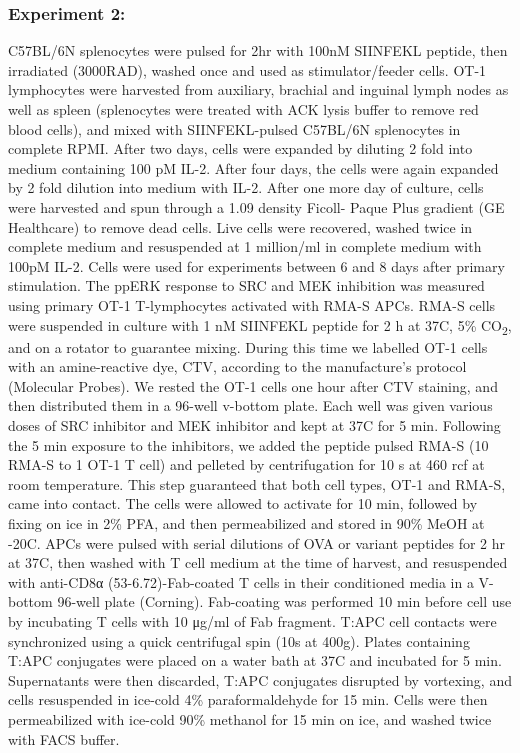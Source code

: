 \documentclass[11pt,a4paper,draft]{article}
\begin{document}
\subsubsection*{Experiment 2:} C57BL/6N splenocytes were pulsed for 2hr with 100nM SIINFEKL peptide, then irradiated (3000RAD), washed once and used as stimulator/feeder cells. OT-1 lymphocytes were harvested from auxiliary, brachial and inguinal lymph nodes as well as spleen (splenocytes were treated with ACK lysis buffer to remove red blood cells), and mixed with SIINFEKL-pulsed C57BL/6N splenocytes in complete RPMI. After two days, cells were expanded by diluting 2 fold into medium containing 100 pM IL-2. After four days, the cells were again expanded by 2 fold dilution into medium with IL-2. After one more day of culture, cells were harvested and spun through a 1.09 density Ficoll- Paque Plus gradient (GE Healthcare) to remove dead cells. Live cells were recovered, washed twice in complete medium and resuspended at 1 million/ml in complete medium with 100pM IL-2. Cells were used for experiments between 6 and 8 days after primary stimulation. The ppERK response to SRC and MEK inhibition was measured using primary OT-1 T-lymphocytes activated with RMA-S APCs. RMA-S cells were suspended in culture with 1 nM SIINFEKL peptide for 2 h at 37C, 5\% CO\textsubscript{2}, and on a rotator to guarantee mixing. During this time we labelled OT-1 cells with an amine-reactive dye, CTV, according to the manufacture’s protocol (Molecular Probes). We rested the OT-1 cells one hour after CTV staining, and then distributed them in a 96-well v-bottom plate. Each well was given various doses of SRC inhibitor and MEK inhibitor and kept at 37C for 5 min. Following the 5 min exposure to the inhibitors, we added the peptide pulsed RMA-S (10 RMA-S to 1 OT-1 T cell) and pelleted by centrifugation for 10 s at 460 rcf at room temperature. This step guaranteed that both cell types, OT-1 and RMA-S, came into contact. The cells were allowed to activate for 10 min, followed by fixing on ice in 2\% PFA, and then permeabilized and stored in 90\% MeOH at  -20C. APCs were pulsed with serial dilutions of OVA or variant peptides for 2 hr at 37C, then washed with T cell medium at the time of harvest, and resuspended with anti-CD8α (53-6.72)-Fab-coated T cells in their conditioned media in a V-bottom 96-well plate (Corning). Fab-coating was performed 10 min before cell use by incubating T cells with 10 μg/ml of Fab fragment. T:APC cell contacts were synchronized using a quick centrifugal spin (10s at 400g). Plates containing T:APC conjugates were placed on a water bath at 37C and incubated for 5 min. Supernatants were then discarded, T:APC conjugates disrupted by vortexing, and cells resuspended in ice-cold 4\% paraformaldehyde for 15 min. Cells were then permeabilized with ice-cold 90\% methanol for 15 min on ice, and washed twice with FACS buffer. 
\end{document}
